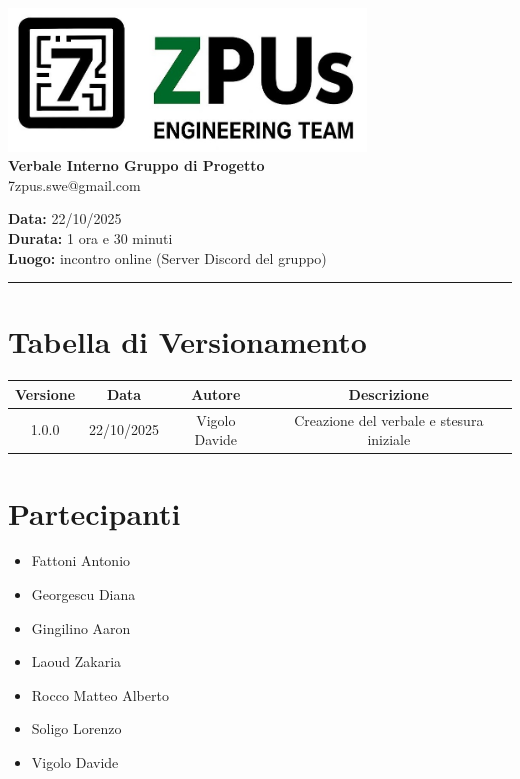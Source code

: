 \documentclass[a4paper,12pt]{article}
\begin{document}
\begin{center}
    \includegraphics[width=9.5cm]{../../../assets/logo7zpus.jpg}\\
    \Large \textbf{Verbale Interno Gruppo di Progetto}\\
    \vspace{0.5cm}
    \small\hspace{10cm} 7zpus.swe@gmail.com
\end{center}

\noindent
\textbf{Data:} 22/10/2025 \\
\textbf{Durata:} 1 ora e 30 minuti \\
\textbf{Luogo:} incontro online (Server Discord del gruppo)

\vspace{0.3cm}
\hrule
\vspace{0.5cm}

\tableofcontents

\newpage

\section{Tabella di Versionamento}
    \begin{tabular}{|c|c|c|c|}
        \hline
        \textbf{Versione} & \textbf{Data} & \textbf{Autore} & \textbf{Descrizione} \\
        \hline
        1.0.0 & 22/10/2025 & Vigolo Davide & Creazione del verbale e stesura iniziale \\

        \hline
    \end{tabular}


\section{Partecipanti}
\begin{itemize}[noitemsep]
    \item Fattoni Antonio 
    \item Georgescu Diana
    \item Gingilino Aaron
    \item Laoud Zakaria
    \item Rocco Matteo Alberto
    \item Soligo Lorenzo
    \item Vigolo Davide
\end{itemize}
\end{document}
